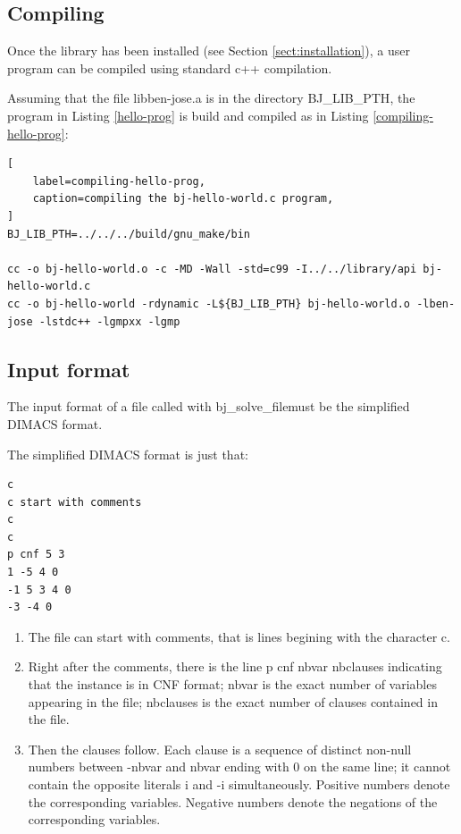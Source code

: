 \documentclass{easychair}
\newcommand{\bjsolvefile}{bj\_solve\_file}
\newcommand{\BJLIBPTH}{BJ\_LIB\_PTH}
\begin{document}
\subsection{Compiling}
\label{sect:dimacs}

Once the library has been installed (see Section \ref{sect:installation}), a user program can be compiled using standard c++ compilation.

Assuming that the file libben-jose.a is in the directory {\BJLIBPTH}, the program in Listing \ref{hello-prog} is build and compiled as in Listing \ref{compiling-hello-prog}:

\begin{lstlisting}[
	label=compiling-hello-prog, 
	caption=compiling the bj-hello-world.c program,
]
BJ_LIB_PTH=../../../build/gnu_make/bin

cc -o bj-hello-world.o -c -MD -Wall -std=c99 -I../../library/api bj-hello-world.c
cc -o bj-hello-world -rdynamic -L${BJ_LIB_PTH} bj-hello-world.o -lben-jose -lstdc++ -lgmpxx -lgmp
\end{lstlisting}


\subsection{Input format}
\label{sect:dimacs}

The input format of a file called with \bjsolvefile must be the simplified DIMACS format.

The simplified DIMACS format is just that:

\begin{lstlisting}[label=dimacs-format, caption=Simplified DIMACS CNF format example,]
c
c start with comments
c
c 
p cnf 5 3
1 -5 4 0
-1 5 3 4 0
-3 -4 0
\end{lstlisting}

\begin{enumerate}
\item
The file can start with comments, that is lines begining with the character c.

\item
Right after the comments, there is the line p cnf nbvar nbclauses indicating that the instance is in CNF format; nbvar is the exact number of variables appearing in the file; nbclauses is the exact number of clauses contained in the file.

\item
Then the clauses follow. Each clause is a sequence of distinct non-null numbers between -nbvar and nbvar ending with 0 on the same line; it cannot contain the opposite literals i and -i simultaneously. Positive numbers denote the corresponding variables. Negative numbers denote the negations of the corresponding variables.
\end{enumerate}
\end{document}
